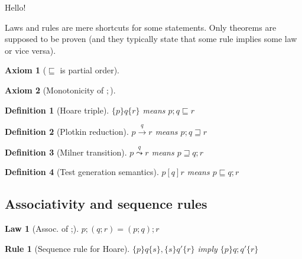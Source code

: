 \documentclass{article}
\begin{document}
\newcommand{\refines}{\sqsubseteq}
\newcommand{\refinedby}{\sqsupseteq}
\newcommand{\eps}{\varepsilon}

\newcommand{\plotkin}[1]{\stackrel{#1}{\rightarrow}}
\newcommand{\milner}[1]{\stackrel{#1}{\leadsto}}


\newtheorem{axiom}{Axiom}
\newtheorem{law}{Law}
\newtheorem{rul}{Rule}  %
\newtheorem{theorem}{Theorem}
\newtheorem{definition}{Definition}

Hello!

Laws and rules are mere shortcuts for some statements.
Only theorems are supposed to be proven (and they typically state that
some rule implies some law or vice versa).


\begin{axiom} [$\refines$ is partial order]
\end{axiom}

\begin{axiom} [Monotonicity of $;$]
\end{axiom}


\begin{definition} [Hoare triple]
$\{p\}q\{r\}$ means $p;q \refines r$
\end{definition}

\begin{definition} [Plotkin reduction]
$p \plotkin{q} r$ means $p; q \refinedby r$
\end{definition}

\begin{definition} [Milner transition]
$p \milner{q} r$ means $p \refinedby q; r$
\end{definition}

\begin{definition} [Test generation semantics]
$p[q]r$ means $p \refines q;r$
\end{definition}


\subsection*{Associativity and sequence rules}

\begin{law}[Assoc. of ;]
$p;(q;r) = (p;q);r$
\end{law}

\begin{rul}[Sequence rule for Hoare]
$\{p\}q\{s\}, \{s\}q'\{r\}$ imply $\{p\}q;q'\{r\}$
\end{rul}
\end{document}

